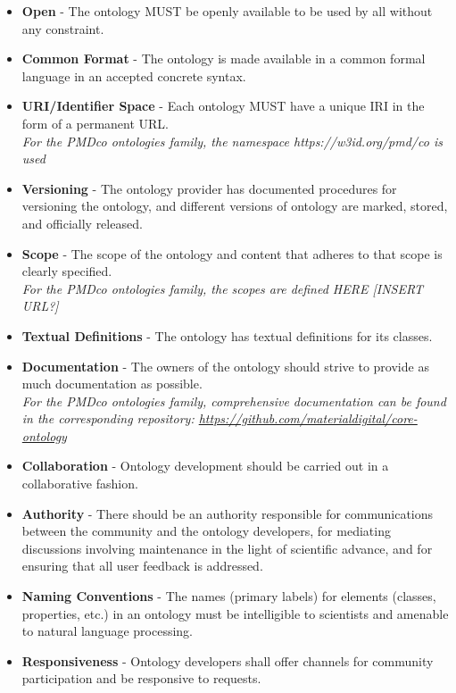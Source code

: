 \begin{itemize}
    \item \textbf{Open} - The ontology MUST be openly available to be used by all without any constraint.
    \item \textbf{Common Format} - The ontology is made available in a common formal language in an accepted concrete syntax.
    \item \textbf{URI/Identifier Space} - Each ontology MUST have a unique IRI in the form of a permanent URL. \\ \textit{For the PMDco ontologies family, the namespace https://w3id.org/pmd/co is used}
    \item \textbf{Versioning} - The ontology provider has documented procedures for versioning the ontology, and different versions of ontology are marked, stored, and officially released.
    \item \textbf{Scope} - The scope of the ontology and content that adheres to that scope is clearly specified. \\ \textit{For the PMDco ontologies family, the scopes are defined HERE [INSERT URL?]}
    \item \textbf{Textual Definitions} - The ontology has textual definitions for its classes.
    \item \textbf{Documentation} - The owners of the ontology should strive to provide as much documentation as possible. \\ \textit{For the PMDco ontologies family, comprehensive documentation can be found in the corresponding {\github}  repository: \url{https://github.com/materialdigital/core-ontology}}
    \item \textbf{Collaboration} - Ontology development should be carried out in a collaborative fashion.
    \item \textbf{Authority} - There should be an authority responsible for communications between the community and the ontology developers, for mediating discussions involving maintenance in the light of scientific advance, and for ensuring that all user feedback is addressed.
    \item \textbf{Naming Conventions} - The names (primary labels) for elements (classes, properties, etc.) in an ontology must be intelligible to scientists and amenable to natural language processing.
    \item \textbf{Responsiveness} - Ontology developers shall offer channels for community participation and be responsive to requests.
\end{itemize}

